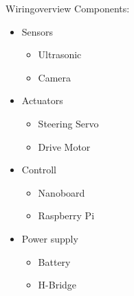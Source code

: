  
\begin{frame}[plain]{Wiring}{overview}
	Components:
	\center
	\pause
	\begin{itemize}
		\item Sensors
		\begin{itemize}
			\item Ultrasonic
			\item Camera
		\end{itemize}
		\pause
		\item Actuators
		\begin{itemize}
			\item Steering Servo
			\item Drive Motor
		\end{itemize}
		\pause
		\item Controll
		\begin{itemize}
			\item Nanoboard
			\item Raspberry Pi
		\end{itemize}
		\pause
		\item Power supply
		\begin{itemize}
			\item Battery
			\item H-Bridge
		\end{itemize}
	\end{itemize}
	
\end{frame}
 
 
 
\setcounter{ctra}{1}
%
{%
\begin{frame}[plain,noframenumbering]{Wiring}
	\texttt{[image: Feathergraphics/wiring\\the\\value\{ctra]}}
\addtocounter{page}{-1}
\end{frame}
}
